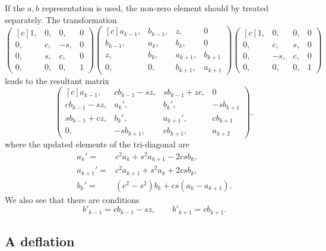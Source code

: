 \begin{refsection}
If the $a, b$ representation is used, the non-zero element should
by treated separately. The transformation
\begin{equation}
  \begin{pmatrix*}[c]
    1, & 0, &  0, & 0\\
    0, & c, & -s, & 0\\
    0, & s, &  c, & 0\\
    0, & 0, &  0, & 1
  \end{pmatrix*}
  \begin{pmatrix*}[c]
    a_{k-1}, & b_{k-1}, &  z, & 0\\
    b_{k-1}, & a_k, &    b_k, & 0\\
    z, & b_k, &  a_{k+1}, & b_{k+1}\\
    0, & 0, & b_{k+1}, & a_{k+1}
  \end{pmatrix*}
  \begin{pmatrix*}[c]
    1, & 0, &  0, & 0\\
    0, & c, &  s, & 0\\
    0, &-s, &  c, & 0\\
    0, & 0, &  0, & 1
  \end{pmatrix*}
\end{equation}
leads to the resultant matrix
\begin{equation}
  \begin{pmatrix*}[c]
    a_{k-1}, & cb_{k-1} - sz, & sb_{k-1} + zc, & 0\\
    cb_{k-1} - sz, & a_k', & b_k', & -sb_{k+1}\\
    sb_{k-1}+cz, & b_k', & a_{k+1}', & cb_{k+1}\\
    0, & -sb_{k+1}, & c b_{k+1}, & a_{k+2}
  \end{pmatrix*},
\end{equation}
where the updated elements of the tri-diagonal are
\begin{align}
  a_k' =& c^2 a_k + s^2 a_{k+1} - 2csb_k,\\
  a_{k+1}' =& c^2 a_{k+1} + s^2 a_k + 2csb_k,\\
  b_k' =& (c^2 - s^2) b_k + cs (a_k - a_{k+1}).
\end{align}
We also see that there are conditions
\begin{equation}
  b'_{k-1} = c b_{k-1} - s z, \qquad b'_{k+1} = c b_{k+1}.
\end{equation}



\subsection{A deflation}


\end{refsection}
